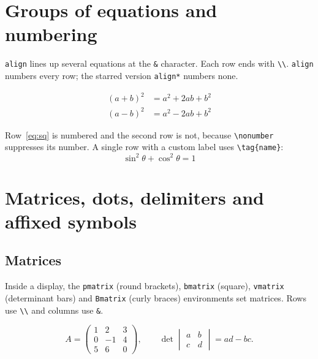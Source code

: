 \documentclass[11pt,a4paper]{article}
\begin{document}
\section{Groups of equations and numbering}

\texttt{align} lines up several equations at the \verb|&| character.
Each row ends with \verb|\\|. \texttt{align} numbers every row; the
starred version \texttt{align*} numbers none.

\begin{align}
  (a+b)^2 &= a^2 + 2ab + b^2 \label{eq:sq} \\
  (a-b)^2 &= a^2 - 2ab + b^2 \nonumber
\end{align}

Row~\eqref{eq:sq} is numbered and the second row is not, because
\verb|\nonumber| suppresses its number. A single row with a custom label
uses \verb|\tag{name}|:
\begin{equation}
  \sin^2\theta + \cos^2\theta = 1 \tag{$\star$}
\end{equation}

\section{Matrices, dots, delimiters and affixed symbols}

\subsection{Matrices}

Inside a display, the \texttt{pmatrix} (round brackets), \texttt{bmatrix}
(square), \texttt{vmatrix} (determinant bars) and \texttt{Bmatrix}
(curly braces) environments set matrices. Rows use \verb|\\| and
columns use \verb|&|.

\[
  A = \begin{pmatrix} 1 & 2 & 3 \\ 0 & -1 & 4 \\ 5 & 6 & 0 \end{pmatrix},
  \qquad
  \det\begin{vmatrix} a & b \\ c & d \end{vmatrix} = ad - bc.
\]
\end{document}
